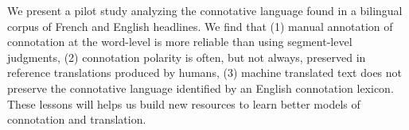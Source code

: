 We present a pilot study analyzing the connotative language found in a bilingual corpus of French and English headlines. We find that (1) manual annotation of connotation at the word-level is more reliable than using segment-level judgments, (2) connotation polarity is often, but not always, preserved in reference translations produced by humans, (3) machine translated text does not preserve the connotative language identified by an English connotation lexicon. These lessons will helps us build new resources to learn better models of connotation and translation.
